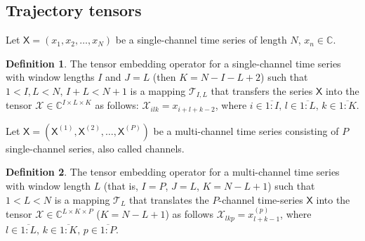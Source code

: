 \documentclass[12pt]{article}
\newcommand{\tX}{\mathsf{X}}
\newcommand{\calX}{\mathcal{X}}
\newcommand{\calT}{\mathcal{T}}
\theoremstyle{definition}
\newtheorem{definition}{Definition}
\begin{document}
\subsection{Trajectory tensors}
Let $\tX = (x_1, x_2, \ldots, x_N)$ be a single-channel time series
of length $N$, $x_n \in \mathbb{C}$.
\begin{definition}
  The tensor embedding operator for a single-channel time series with
  window lengths $I$ and $J=L$ (then $K=N-I-L+2$) such that ${1< I,L < N},\, {I + L < N + 1}$
  is a mapping $\calT_{I,L}$ that transfers the series
  $\tX$ into the tensor $\calX \in \mathbb{C}^{I\times L \times K}$
  as follows: ${\mathcal{X}_{ilk}=x_{i+l+k-2}}$, where
  $i\in \overline{1:I},\, l \in\overline{1:L},\, k \in\overline{1:K}$.
\end{definition}

Let $\tX = (\tX^{(1)}, \tX^{(2)}, \ldots, \tX^{(P)})$ be a multi-channel
time series consisting of $P$ single-channel series, also called channels.
\begin{definition}
  The tensor embedding operator for a multi-channel time series with
  window length $L$ (that is, $I=P$, $J=L$, $K=N-L+1$) such that ${1< L < N}$ is a mapping $\calT_{L}$
  that translates the
  $P$-channel time-series $\tX$ into the tensor $\calX \in
  \mathbb{C}^{L\times K \times P}$ (${K = N - L + 1}$) as follows
  $\mathcal{X}_{lkp} =  x_{l+k-1}^{(p)}$, where ${l \in
  \overline{1:L}},\, {k \in \overline{1:K}},\, {p \in \overline{1:P}}$.
\end{definition}
\end{document}
